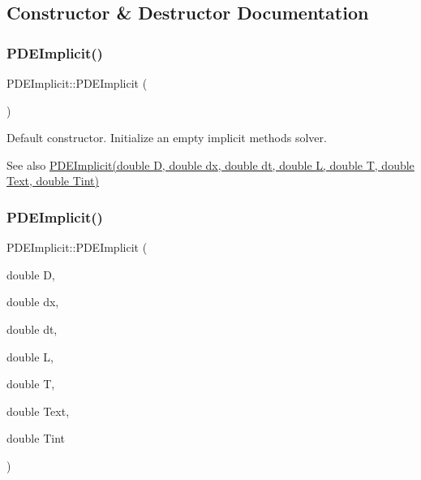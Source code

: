 \subsection{Constructor \& Destructor Documentation}
\mbox{\label{class_p_d_e_implicit_a6eca74fdfc3e0173bc81562548bbbdc9}} 
\subsubsection{\texorpdfstring{P\+D\+E\+Implicit()}{PDEImplicit()}\hspace{0.1cm}{\footnotesize\ttfamily [1/2]}}
{\footnotesize\ttfamily P\+D\+E\+Implicit\+::\+P\+D\+E\+Implicit (\begin{DoxyParamCaption}{ }\end{DoxyParamCaption})\hspace{0.3cm}{\ttfamily [inline]}}

Default constructor. Initialize an empty implicit methods solver. \begin{DoxySeeAlso}{See also}
\hyperlink{class_p_d_e_implicit_a95e1d8572ae2356554f25633391f02f2}{P\+D\+E\+Implicit(double D, double dx, double dt, double L, double T, double Text, double Tint)} 
\end{DoxySeeAlso}
\mbox{\label{class_p_d_e_implicit_a95e1d8572ae2356554f25633391f02f2}} 
\subsubsection{\texorpdfstring{P\+D\+E\+Implicit()}{PDEImplicit()}\hspace{0.1cm}{\footnotesize\ttfamily [2/2]}}
{\footnotesize\ttfamily P\+D\+E\+Implicit\+::\+P\+D\+E\+Implicit (\begin{DoxyParamCaption}\item[{double}]{D,  }\item[{double}]{dx,  }\item[{double}]{dt,  }\item[{double}]{L,  }\item[{double}]{T,  }\item[{double}]{Text,  }\item[{double}]{Tint }\end{DoxyParamCaption})\hspace{0.3cm}{\ttfamily [inline]}}

